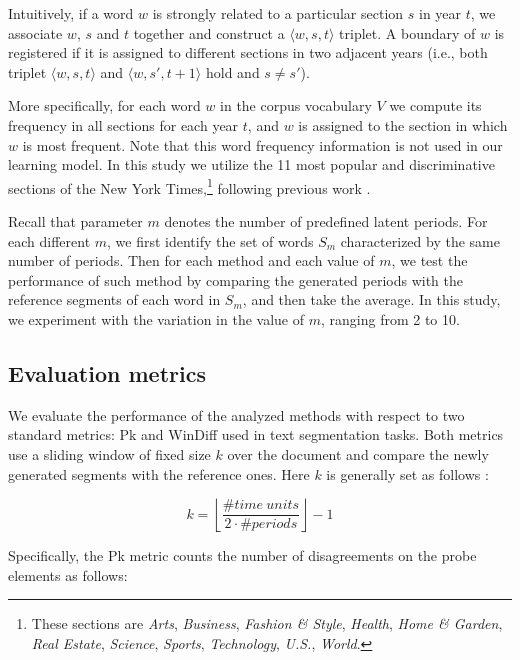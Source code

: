 \documentclass[output=paper]{langsci/langscibook}
\begin{document}
Intuitively, if a word $w$ is strongly related to a particular section $s$ in year $t$, we associate $w$, $s$ and $t$ together and construct a $\langle w, s, t\rangle$ triplet. A boundary of $w$ is registered if it is assigned to different sections in two adjacent years (i.e., both triplet $\langle w, s, t\rangle$ and $\langle w, s', t + 1\rangle$ hold and $s \neq s'$).

More specifically, for each word $w$ in the corpus vocabulary $V$ we compute its frequency in all sections for each year $t$, and $w$ is assigned to the section in which $w$ is most frequent. Note that this word frequency information is not used in our learning model. In this study we utilize the 11 most popular and discriminative sections of the New York Times,\footnote{These sections are \textit{Arts}, \textit{Business}, \textit{Fashion \& Style}, \textit{Health}, \textit{Home \& Garden}, \textit{Real Estate}, \textit{Science}, \textit{Sports}, \textit{Technology}, \textit{U.S.}, \textit{World}.} following previous work \citep{yao2018dynamic}.

Recall that parameter $m$ denotes the number of predefined latent periods. For each different $m$, we first identify the set of words $S_{m}$ characterized by the same number of periods. Then for each method and each value of $m$, we test the performance of such method by comparing the generated periods with the reference segments of each word in $S_{m}$, and then take the average. In this study, we experiment with the variation in the value of $m$, ranging from 2 to 10.

\subsection{Evaluation metrics}

We evaluate the performance of the analyzed methods with respect to two standard metrics: Pk \citep{beeferman1999statistical} and WinDiff \citep{pevzner2002critique} used in text segmentation tasks. Both metrics use a sliding window of fixed size $k$ over the document and compare the newly generated segments with the reference ones. Here $k$ is generally set as follows \citep{beeferman1999statistical}:

\begin{equation}\tag{11}
k = \left\lfloor\frac{\#time \ units}{2\cdot \#periods}\right\rfloor - 1
\end{equation}

Specifically, the Pk metric counts the number of disagreements on the probe elements as follows:
\end{document}
